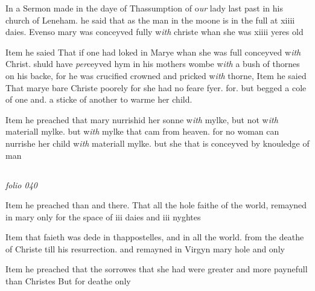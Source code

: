\documentclass[12pt, a4paper]{book}
\begin{document}
		\ifthenelse{\isodd{\thepage}}
		{\reversemarginpar}
		{\normalmarginpar}
		In a Sermon made in the daye of Thassumption
 	of o\textit{ur} lady last past in his church of Leneham.
 he said that as the man in the moone is in the
 full at xiiii daies. Evenso mary was conceyved
 fully w\textit{ith }christe whan she was xiiii yeres old

		\ifthenelse{\isodd{\thepage}}
		{\reversemarginpar}
		{\normalmarginpar}
		 Item he saied That if one had loked in Marye
 whan she was full conceyved w\textit{ith} Christ. shuld
 have \textit{per}ceyved hym in his mothers wombe w\textit{ith} a bush
 of thornes on his backe, for he was crucified
 crowned and pricked w\textit{ith} thorne,
 Item he saied That marye bare Christe poorely
 for she had no feare fyer. for. but begged a
 cole of one and. a sticke of another to warme
 her child.
	
				\marginpar[\vspace{0.5cm}{\textcolor{Gray}{herecie}}]{}
			
		\ifthenelse{\isodd{\thepage}}
		{\reversemarginpar}
		{\normalmarginpar}
		Item he preached that mary nurrishid her sonne
 w\textit{ith} mylke, but not w\textit{ith} materiall mylke. but w\textit{ith}
 mylke that cam from heaven. for no woman can
 nurrishe her child w\textit{ith} materiall mylke. but she that
 is conceyved by knouledge of man


\dotfill
					  \subsection*{}

\textit{folio 040}


	
		
		\ifthenelse{\isodd{\thepage}}
		{\reversemarginpar}
		{\normalmarginpar}
		Item he preached than and there. That all the hole faithe of
			the world, remayned in mary only for the space of iii daies and iii
			nyghtes
	
	
		
		\ifthenelse{\isodd{\thepage}}
		{\reversemarginpar}
		{\normalmarginpar}
		Item that faieth was dede in thappostelles, and in all the
			world. from the deathe of Christe till his resurrection. and remayned in
			Virgyn mary hole and only
	
	
		
		\ifthenelse{\isodd{\thepage}}
		{\reversemarginpar}
		{\normalmarginpar}
		Item he preached that the sorrowes that she had were greater
			and more paynefull than Christes But for deathe only
	
\end{document}
